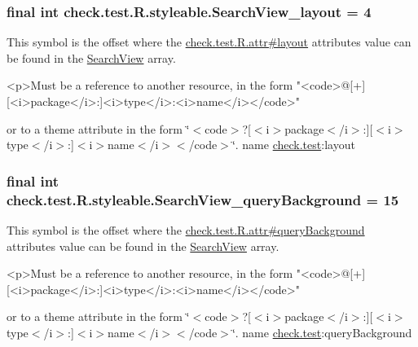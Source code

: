 \subsubsection[{Search\+View\+\_\+layout}]{\setlength{\rightskip}{0pt plus 5cm}final int check.\+test.\+R.\+styleable.\+Search\+View\+\_\+layout = 4\hspace{0.3cm}{\ttfamily [static]}}\label{classcheck_1_1test_1_1_r_1_1styleable_a43de74d589f89c8acfb186f9078f5192}
This symbol is the offset where the \hyperlink{classcheck_1_1test_1_1_r_1_1attr_ad35b4cdae10aba976d5133cc5f47e7af}{check.\+test.\+R.\+attr\#layout} attribute\textquotesingle{}s value can be found in the \hyperlink{classcheck_1_1test_1_1_r_1_1styleable_af133609668e9a4263b21387e9a7574f8}{Search\+View} array.

\begin{DoxyVerb}      <p>Must be a reference to another resource, in the form "<code>@[+][<i>package</i>:]<i>type</i>:<i>name</i></code>"
\end{DoxyVerb}
 or to a theme attribute in the form \char`\"{}$<$code$>$?\mbox{[}$<$i$>$package$<$/i$>$\+:\mbox{]}\mbox{[}$<$i$>$type$<$/i$>$\+:\mbox{]}$<$i$>$name$<$/i$>$$<$/code$>$\char`\"{}.  name \hyperlink{namespacecheck_1_1test}{check.\+test}\+:layout \hypertarget{classcheck_1_1test_1_1_r_1_1styleable_ae1dc74a07b7705c97c66e2f4ed17ee37}{}
\subsubsection[{Search\+View\+\_\+query\+Background}]{\setlength{\rightskip}{0pt plus 5cm}final int check.\+test.\+R.\+styleable.\+Search\+View\+\_\+query\+Background = 15\hspace{0.3cm}{\ttfamily [static]}}\label{classcheck_1_1test_1_1_r_1_1styleable_ae1dc74a07b7705c97c66e2f4ed17ee37}
This symbol is the offset where the \hyperlink{classcheck_1_1test_1_1_r_1_1attr_af0a91bf09811eeb964bf4bbeda503819}{check.\+test.\+R.\+attr\#query\+Background} attribute\textquotesingle{}s value can be found in the \hyperlink{classcheck_1_1test_1_1_r_1_1styleable_af133609668e9a4263b21387e9a7574f8}{Search\+View} array.

\begin{DoxyVerb}      <p>Must be a reference to another resource, in the form "<code>@[+][<i>package</i>:]<i>type</i>:<i>name</i></code>"
\end{DoxyVerb}
 or to a theme attribute in the form \char`\"{}$<$code$>$?\mbox{[}$<$i$>$package$<$/i$>$\+:\mbox{]}\mbox{[}$<$i$>$type$<$/i$>$\+:\mbox{]}$<$i$>$name$<$/i$>$$<$/code$>$\char`\"{}.  name \hyperlink{namespacecheck_1_1test}{check.\+test}\+:query\+Background \hypertarget{classcheck_1_1test_1_1_r_1_1styleable_a81a033a05b9ad3bb82d2aa9daa757cfb}{}
